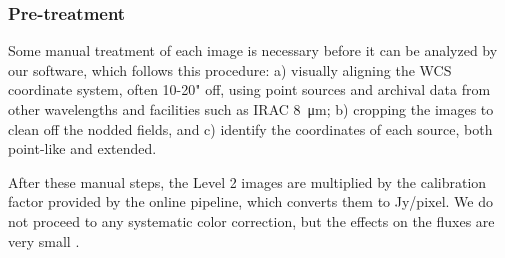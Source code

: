 \subsubsection{Pre-treatment}
Some manual treatment of each image is necessary before it can be analyzed by our software, which follows this procedure: a) visually aligning the WCS coordinate system, often 10-20" off, using point sources and archival data from other wavelengths and facilities such as IRAC \SI{8}{\micro\meter}; b) cropping the images to clean off the nodded fields, and c) identify the coordinates of each source, both point-like and extended.

After these manual steps, the Level 2 images are multiplied by the calibration factor provided by the online pipeline, which converts them to Jy/pixel. We do not proceed to any systematic color correction, but the effects on the fluxes are very small \citep{Herter:2013by}.

